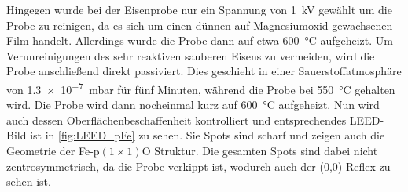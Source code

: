         Hingegen wurde bei der Eisenprobe nur ein Spannung von \SI{1}{\kilo\volt} gewählt um die Probe zu reinigen, da es sich um einen dünnen auf Magnesiumoxid gewachsenen Film handelt.
        Allerdings wurde die Probe dann auf etwa \SI{600}{\celsius} aufgeheizt.
        Um Verunreinigungen des sehr reaktiven sauberen Eisens zu vermeiden, wird die Probe anschließend direkt passiviert.
        Dies geschieht in einer Sauerstoffatmosphäre von \SI{1.3e-7}{\milli\bar} für fünf Minuten, während die Probe bei \SI{550}{\celsius} gehalten wird.
        Die Probe wird dann nocheinmal kurz auf \SI{600}{\celsius} aufgeheizt.
        Nun wird auch dessen Oberflächenbeschaffenheit kontrolliert und entsprechendes LEED-Bild ist in \autoref{fig:LEED_pFe} zu sehen.
        Sie Spots sind scharf und zeigen auch die Geometrie der Fe-p$(1 \times 1)$O Struktur.
        Die gesamten Spots sind dabei nicht zentrosymmetrisch, da die Probe verkippt ist, wodurch auch der (0,0)-Reflex zu sehen ist.
            

